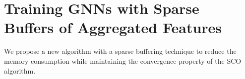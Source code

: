 \section{Training GNNs with Sparse Buffers of Aggregated Features}
We propose a new algorithm with a sparse buffering technique to reduce the memory consumption while maintaining the convergence property of the SCO algorithm. 



